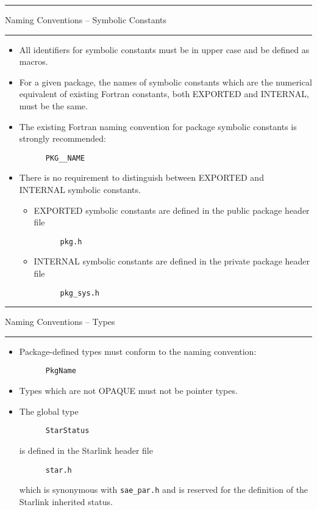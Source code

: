\documentclass[twoside,11pt]{article}
\newcounter{sruleno}
\newcommand{\srule}[1]{
    \addtocounter{sruleno}{1}
    \goodbreak
    \rule[0.5ex]{\textwidth}{0.3mm}
    {\Large #1 \hfill {\thesruleno}}
    \rule[0.5ex]{\textwidth}{0.1mm}
}
\newcommand{\srule}[1]{
       \addtocounter{sruleno}{1}
       \begin{rawhtml} <HR> \end{rawhtml}
       {\Large \thesruleno}~~~~{\Large #1}
       \begin{rawhtml} <HR> \end{rawhtml}
       \end{tabular}
  }
\begin{document}
\srule{Naming Conventions -- Symbolic Constants}
\begin{itemize}
\item All identifiers for symbolic constants must be in upper case and be
defined as macros.
\item For a given package, the names of symbolic constants which are the
numerical equivalent of existing Fortran constants, both EXPORTED and
INTERNAL, must be the same.
\item The existing Fortran naming convention for package symbolic constants
is strongly recommended:
\begin{verbatim}
      PKG__NAME
\end{verbatim}
\item There is no requirement to distinguish between EXPORTED and INTERNAL
symbolic constants.
\begin{itemize}
\item EXPORTED symbolic constants are defined in the public package header
file
\begin{verbatim}
      pkg.h
\end{verbatim}
\item INTERNAL symbolic constants are defined in the private package header
file
\begin{verbatim}
      pkg_sys.h
\end{verbatim}
\end{itemize}
\end{itemize}

\srule{Naming Conventions -- Types}
\begin{itemize}
\item Package-defined types must conform to the naming convention:
\begin{verbatim}
      PkgName
\end{verbatim}
\item Types which are not OPAQUE must not be pointer types.
\item The global type
\begin{verbatim}
      StarStatus
\end{verbatim}
is defined in the Starlink header file
\begin{verbatim}
      star.h
\end{verbatim}
which is synonymous with {\tt sae\_par.h} and is reserved for the definition
of the Starlink inherited status.
\end{itemize}
\end{document}
